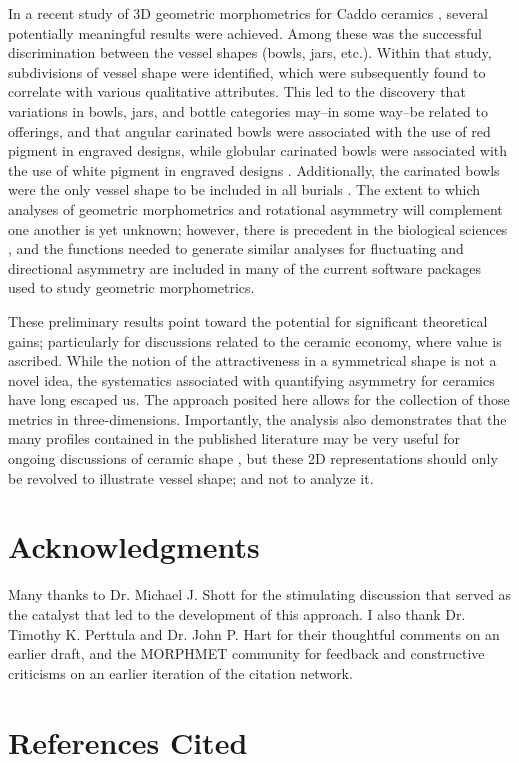 \documentclass[preprint,12pt]{elsarticle}
\begin{document}
In a recent study of 3D geometric morphometrics for Caddo ceramics \citep{Selden:2}, several potentially meaningful results were achieved. Among these was the successful discrimination between the vessel shapes (bowls, jars, etc.). Within that study, subdivisions of vessel shape were identified, which were subsequently found to correlate with various qualitative attributes. This led to the discovery that variations in bowls, jars, and bottle categories may--in some way--be related to offerings, and that angular carinated bowls were associated with the use of red pigment in engraved designs, while globular carinated bowls were associated with the use of white pigment in engraved designs \citep{Selden:2}. Additionally, the carinated bowls were the only vessel shape to be included in all burials \citep{Selden:2}. The extent to which analyses of geometric morphometrics and rotational asymmetry will complement one another is yet unknown; however, there is precedent in the biological sciences  \cite{Savriama:1, Savriama:2}, and the functions needed to generate similar analyses for fluctuating and directional asymmetry are included in many of the current software packages used to study geometric morphometrics.

These preliminary results point toward the potential for significant theoretical gains; particularly for discussions related to the ceramic economy, where value is ascribed. While the notion of the attractiveness in a symmetrical shape is not a novel idea, the systematics associated with quantifying asymmetry for ceramics have long escaped us. The approach posited here allows for the collection of those metrics in three-dimensions. Importantly, the analysis also demonstrates that the many profiles contained in the published literature may be very useful for ongoing discussions of ceramic shape \cite{Wilczek:1}, but these 2D representations should only be revolved to illustrate vessel shape; and not to analyze it.

\section{Acknowledgments}

Many thanks to Dr. Michael J. Shott for the stimulating discussion that served as the catalyst that led to the development of this approach. I also thank Dr. Timothy K. Perttula and Dr. John P. Hart for their thoughtful comments on an earlier draft, and the MORPHMET community for feedback and constructive criticisms on an earlier iteration of the citation network.

\section{References Cited}



\end{document}
